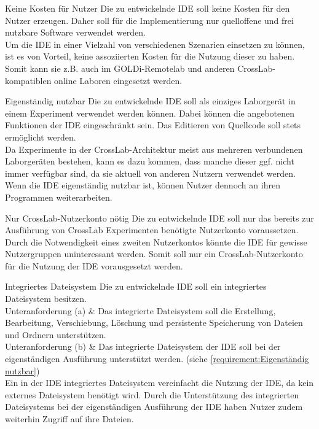 \begin{requirement}{Keine Kosten für Nutzer}
    \reqdescription Die zu entwickelnde IDE soll keine Kosten für den Nutzer erzeugen. Daher soll für die Implementierung nur quelloffene und frei nutzbare Software verwendet werden.  \\
    \reqrationale Um die IDE in einer Vielzahl von verschiedenen Szenarien einsetzen zu können, ist es von Vorteil, keine assoziierten Kosten für die Nutzung dieser zu haben. Somit kann sie z.B. auch im GOLDi-Remotelab und anderen CrossLab-kompatiblen online Laboren eingesetzt werden. \\
\end{requirement}

\begin{requirement}{Eigenständig nutzbar}
    \reqdescription Die zu entwickelnde IDE soll als einziges Laborgerät in einem Experiment verwendet werden können. Dabei können die angebotenen Funktionen der IDE eingeschränkt sein. Das Editieren von Quellcode soll stets ermöglicht werden. \\
    \reqrationale Da Experimente in der CrossLab-Architektur meist aus mehreren verbundenen Laborgeräten bestehen, kann es dazu kommen, dass manche dieser ggf. nicht immer verfügbar sind, da sie aktuell von anderen Nutzern verwendet werden. Wenn die IDE eigenständig nutzbar ist, können Nutzer dennoch an ihren Programmen weiterarbeiten. \\
\end{requirement}

\begin{requirement}{Nur CrossLab-Nutzerkonto nötig}
    \reqdescription Die zu entwickelnde IDE soll nur das bereits zur Ausführung von CrossLab Experimenten benötigte Nutzerkonto voraussetzen. \\
    \reqrationale Durch die Notwendigkeit eines zweiten Nutzerkontos könnte die IDE für gewisse Nutzergruppen uninteressant werden. Somit soll nur ein CrossLab-Nutzerkonto für die Nutzung der IDE vorausgesetzt werden. \\
\end{requirement}

\begin{requirement}{Integriertes Dateisystem}
    \reqdescription Die zu entwickelnde IDE soll ein integriertes Dateisystem besitzen. \\
    Unteranforderung (a) & Das integrierte Dateisystem soll die Erstellung, Bearbeitung, Verschiebung, Löschung und persistente Speicherung von Dateien und Ordnern unterstützen. \\
    Unteranforderung (b) & Das integrierte Dateisystem der IDE soll bei der eigenständigen Ausführung unterstützt werden. (siehe \autoref{requirement:Eigenständig nutzbar}) \\
    \reqrationale Ein in der IDE integriertes Dateisystem vereinfacht die Nutzung der IDE, da kein externes Dateisystem benötigt wird. Durch die Unterstützung des integrierten Dateisystems bei der eigenständigen Ausführung der IDE haben Nutzer zudem weiterhin Zugriff auf ihre Dateien. \\
\end{requirement}

